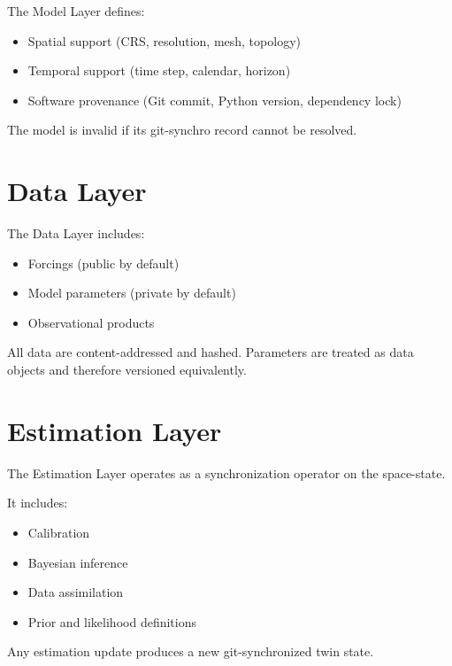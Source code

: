 The Model Layer defines:

\begin{itemize}
\item Spatial support (CRS, resolution, mesh, topology)
\item Temporal support (time step, calendar, horizon)
\item Software provenance (Git commit, Python version, dependency lock)
\end{itemize}

The model is invalid if its git-synchro record cannot be resolved.


\section{Data Layer}
\label{ch:data-layer}

The Data Layer includes:

\begin{itemize}
\item Forcings (public by default)
\item Model parameters (private by default)
\item Observational products
\end{itemize}

All data are content-addressed and hashed. Parameters are treated as data objects and therefore versioned equivalently.


\section{Estimation Layer}
\label{ch:estimation-layer}

The Estimation Layer operates as a synchronization operator on the space-state.

It includes:

\begin{itemize}
\item Calibration
\item Bayesian inference
\item Data assimilation
\item Prior and likelihood definitions
\end{itemize}

Any estimation update produces a new git-synchronized twin state.

